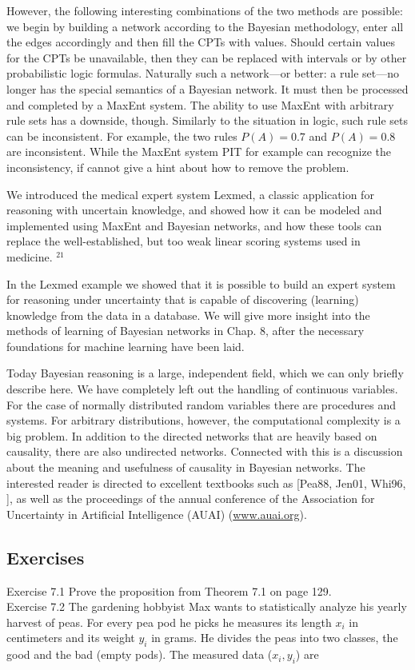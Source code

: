 \documentclass[10pt]{book}
\begin{document}
However, the following interesting combinations of the two methods are possible: we begin by building a network according to the Bayesian methodology, enter all the edges accordingly and then fill the CPTs with values. Should certain values for the CPTs be unavailable, then they can be replaced with intervals or by other probabilistic logic formulas. Naturally such a network—or better: a rule set—no longer has the special semantics of a Bayesian network. It must then be processed and completed by a MaxEnt system.
The ability to use MaxEnt with arbitrary rule sets has a downside, though. Similarly to the situation in logic, such rule sets can be inconsistent. For example, the two rules $P(A)=0.7$ and $P(A)=0.8$ are inconsistent. While the MaxEnt system PIT for example can recognize the inconsistency, if cannot give a hint about how to remove the problem.

We introduced the medical expert system Lexmed, a classic application for reasoning with uncertain knowledge, and showed how it can be modeled and implemented using MaxEnt and Bayesian networks, and how these tools can replace the well-established, but too weak linear scoring systems used in medicine. ${ }^{21}$

In the Lexmed example we showed that it is possible to build an expert system for reasoning under uncertainty that is capable of discovering (learning) knowledge from the data in a database. We will give more insight into the methods of learning of Bayesian networks in Chap. 8, after the necessary foundations for machine learning have been laid.

Today Bayesian reasoning is a large, independent field, which we can only briefly describe here. We have completely left out the handling of continuous variables. For the case of normally distributed random variables there are procedures and systems. For arbitrary distributions, however, the computational complexity is a big problem. In addition to the directed networks that are heavily based on causality, there are also undirected networks. Connected with this is a discussion about the meaning and usefulness of causality in Bayesian networks. The interested reader is directed to excellent textbooks such as [Pea88, Jen01, Whi96, \cite{duda2001pattern}], as well as the proceedings of the annual conference of the Association for Uncertainty in Artificial Intelligence (AUAI) (\href{http://www.auai.org}{www.auai.org}).

\subsection{Exercises}
Exercise 7.1 Prove the proposition from Theorem 7.1 on page 129.\\
Exercise 7.2 The gardening hobbyist Max wants to statistically analyze his yearly harvest of peas. For every pea pod he picks he measures its length $x_{i}$ in centimeters and its weight $y_{i}$ in grams. He divides the peas into two classes, the good and the bad (empty pods). The measured data ($x_{i}, y_{i}$) are
\end{document}
